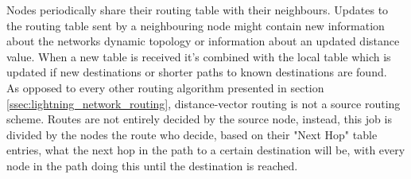 Nodes periodically share their routing table with their neighbours. Updates to the routing table sent by a neighbouring node might contain new information about the networks dynamic topology or information about an updated distance value. When a new table is received it's combined with the local table which is updated if new destinations or shorter paths to known destinations are found. \\
As opposed to every other routing algorithm presented in section \ref{ssec:lightning_network_routing}, distance-vector routing is not a source routing scheme. Routes are not entirely decided by the source node, instead, this job is divided by the nodes the route who decide, based on their "Next Hop" table entries, what the next hop in the path to a certain destination will be, with every node in the path doing this until the destination is reached. \\
